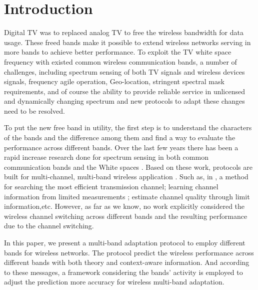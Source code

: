 
\section{Introduction}
\label{sec:introduction}


Digital TV was to replaced analog TV to free the wireless bandwidth for data usage. These freed bands make it possible to extend wireless networks serving in more bands to achieve better performance. To exploit the TV white space frequency with existed common wireless communication bands, a number of challenges, including spectrum sensing of both TV signals and wireless devices signals, frequency agile operation, Geo-location, stringent spectral
mask requirements, and of course the ability to provide reliable
service in unlicensed and dynamically changing spectrum \cite{shellhammer2009technical} and new protocols to adapt these changes need to be resolved. 

To put the new free band in utility, the first step is to understand the characters of the bands and the difference among them and find a way to evaluate the performance across different bands.
Over the last few years there has been a rapid increase research done for spectrum sensing in both common communication bands and the White spaces \cite{rayanchu2011fluid, kim1996pulse,cabric2004implementation}. Based on these work, protocols are built for multi-channel, multi-band wireless application \cite{MOAR,raychaudhuri2003spectrum,sabharwal2007opportunistic}.  Such as, in \cite{mo2005comparison}, a method for searching the most efficient transmission channel; learning channel information from limited measurements \cite{rayanchu2011fluid, sabharwal2007opportunistic}; estimate channel quality through limit information\cite{MOAR},etc. However, as far as we know, no work explicitly considered the wireless channel switching across different bands and the resulting performance due to the channel switching.

In this paper, we present a multi-band adaptation protocol to employ different bands for wireless networks.
The protocol predict the wireless performance across different bands with both theory and context-aware information. And according to these messages, a framework considering the bands' activity is employed to adjust the prediction more accuracy for wireless multi-band adaptation. 

